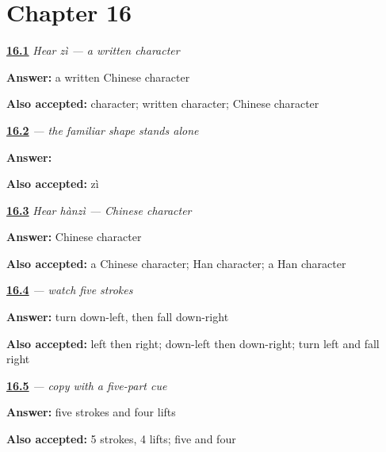 \section*{Chapter 16}

\noindent\begin{minipage}[t]{\linewidth}
\raggedright
\hyperlink{review-ZH-C16-hear-zi-meaning}{\textbf{16.1}} \emph{Hear \emph{zì} — a written character}\par
\small \textbf{Answer:} a written Chinese character\par
\footnotesize \textbf{Also accepted:} character; written character; Chinese character
\end{minipage}\par\medskip

\noindent\begin{minipage}[t]{\linewidth}
\raggedright
\hyperlink{review-ZH-C16-zi-write}{\textbf{16.2}} \emph{ — the familiar shape stands alone}\par
\small \textbf{Answer:} \par
\footnotesize \textbf{Also accepted:}  zì
\end{minipage}\par\medskip

\noindent\begin{minipage}[t]{\linewidth}
\raggedright
\hyperlink{review-ZH-C16-hear-hanzi-meaning}{\textbf{16.3}} \emph{Hear \emph{hànzì} — Chinese character}\par
\small \textbf{Answer:} Chinese character\par
\footnotesize \textbf{Also accepted:} a Chinese character; Han character; a Han character
\end{minipage}\par\medskip

\noindent\begin{minipage}[t]{\linewidth}
\raggedright
\hyperlink{review-ZH-W16-han-observe-order}{\textbf{16.4}} \emph{ — watch five strokes}\par
\small \textbf{Answer:} turn down-left, then fall down-right\par
\footnotesize \textbf{Also accepted:} left then right; down-left then down-right; turn left and fall right
\end{minipage}\par\medskip

\noindent\begin{minipage}[t]{\linewidth}
\raggedright
\hyperlink{review-ZH-W16-han-guided-count}{\textbf{16.5}} \emph{ — copy with a five-part cue}\par
\small \textbf{Answer:} five strokes and four lifts\par
\footnotesize \textbf{Also accepted:} 5 strokes, 4 lifts; five and four
\end{minipage}\par\medskip

